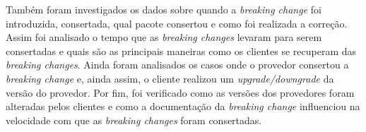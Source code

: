 Também foram investigados os dados sobre quando a \textit{breaking change} foi introduzida, consertada, qual pacote consertou e como foi realizada a correção. Assim foi analisado o tempo que as \textit{breaking changes} levaram para serem consertadas e quais são as principais maneiras como os clientes se recuperam das \textit{breaking changes}. Ainda foram analisados os casos onde o provedor consertou a \textit{breaking change} e, ainda assim, o cliente realizou um \textit{upgrade/downgrade} da versão do provedor. Por fim, foi verificado como as versões dos provedores foram alteradas pelos clientes e como a documentação da \textit{breaking change} influenciou na velocidade com que as \textit{breaking changes} foram consertadas.